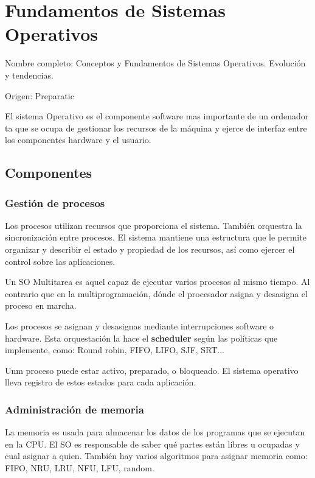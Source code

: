 \setcounter{section}{58} %
\section{Fundamentos de Sistemas Operativos}

Nombre completo: Conceptos y Fundamentos de Sistemas Operativos. Evolución y tendencias.

Origen: Preparatic

\localtableofcontents

El sistema Operativo es el componente software mas importante de un ordenador ta que se ocupa de gestionar los recursos de la máquina y ejerce de interfaz entre los componentes hardware y el usuario.

\subsection{Componentes}

\subsubsection{Gestión de procesos}
Los procesos utilizan recursos que proporciona el sistema. También orquestra la sincronización entre procesos. El sistema mantiene una estructura que le permite organizar y describir el estado y propiedad de los recursos, así como ejercer el control sobre las aplicaciones. 

Un SO Multitarea es aquel capaz de ejecutar varios procesos al mismo tiempo. Al contrario que en la multiprogramación, dónde el procesador asigna y desasigna el proceso en marcha.

Los procesos se asignan y desasignas mediante interrupciones software o hardware. Esta orquestación la hace el \textbf{scheduler} según las políticas que implemente, como: Round robin, FIFO, LIFO, SJF, SRT...

Unm proceso puede estar activo, preparado, o bloqueado. El sistema operativo lleva registro de estos estados para cada aplicación. 

\subsubsection{Administración de memoria}

La memoria es usada para almacenar los datos de los programas que se ejecutan en la CPU. El SO es responsable de saber qué partes están libres u ocupadas y cual asignar a quien. También hay varios algoritmos para asignar memoria como: FIFO, NRU, LRU, NFU, LFU, random.

